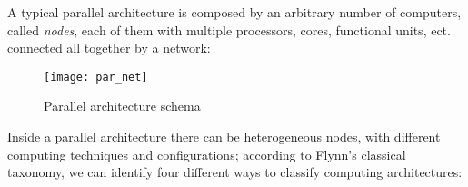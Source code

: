 A typical parallel architecture is composed by an arbitrary number of computers, called \textit{nodes}, each of them with multiple processors, cores, functional units, ect. connected all together by a network:

\begin{figure}[H]

    \centering
    \texttt{[image: par\_net]}
    \caption{Parallel architecture schema}

\end{figure}

Inside a parallel architecture there can be heterogeneous nodes, with different computing techniques and configurations; according to Flynn's classical taxonomy, we can identify four different ways to classify computing architectures: 

